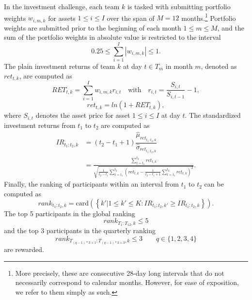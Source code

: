 \documentclass[3p,times,twocolumn]{elsarticle}
\begin{document}
In the investment challenge, each team $k$ is tasked with submitting portfolio weights $w_{i,m,k}$ for assets $1 \leq i \leq I$ over the span of $M=12$ months.\footnote{More precisely, these are consecutive 28-day long intervals that do not necessarily correspond to calendar months. However, for ease of exposition, we refer to them simply as such.}
Portfolio weights are submitted prior to the beginning of each month $1 \leq m \leq M$, and the sum of the portfolio weights in absolute value is restricted to the interval
\begin{equation}
    0.25 \leq \sum_{i=1}^{I}|w_{i,m,k}|\leq 1.
\end{equation}
The plain investment returns of team $k$ at day $t \in T_m$ in month $m$, denoted as $ret_{t,k}$, are computed as
\begin{equation}
    RET_{t,k}= \sum_{i=1}^{I} w_{i,m,k} r_{i,t} \quad \text{with} \quad r_{i,t}=\frac{S_{i,t}}{S_{i,t-1}}-1,
\end{equation}
\begin{equation}\label{eq:log_transform}
    ret_{t,k}= ln(1+RET_{t,k}),
\end{equation}
where $S_{i,t}$ denotes the asset price for asset $1 \leq i \leq I$ at day $t$.
The standardized investment returns from $t_1$ to $t_2$ are computed as
\begin{equation}\label{eq:ir_definition}
    \begin{split}
        IR_{t_1:t_2,k}&= (t_2-t_1+1)\dfrac{\widehat{\mu}_{ret_{t_1:t_2,k}}}{\widehat{\sigma}_{ret_{t_1:t_2,k}}}\\
        &= \frac{\sum\limits_{t=t_1}^{t_{2}} ret_{t,k}}{\sqrt{\frac{1}{t_2 - t_1}\sum\limits_{t=t_1}^{t_2}\left( ret_{t,k} - \frac{1}{t_2 - t_1 + 1}\sum\limits_{t=t_1}^{t_{2}} ret_{t,k} \right)^{2}}}.
    \end{split}
\end{equation}
Finally, the ranking of participants within an interval from $t_1$ to $t_2$ can be computed as
\begin{equation}
    rank_{t_1:t_2,k}=\textrm{card}(\left\{ k'| 1 \leq k' \leq K: IR_{t_1:t_2,k'} \geq IR_{t_1:t_2,k} \right\}).
\end{equation}
The top 5 participants in the global ranking
\begin{equation}
    rank_{T_{1}:T_{12},k} \leq 5
\end{equation}
and the top 3 participants in the quarterly ranking
\begin{equation}
    rank_{T_{(q-1)*3+1}:T_{(q-1)*3+3},k} \leq 3 \qquad q \in \{1,2,3,4\}
\end{equation}
are rewarded.
\end{document}
